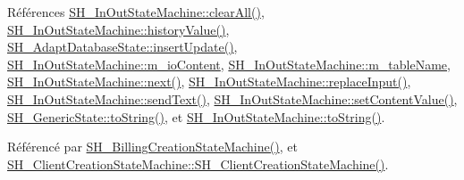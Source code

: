 Références \hyperlink{classSH__InOutStateMachine_ad722deb53285919796b04db5af6e51b4}{S\-H\-\_\-\-In\-Out\-State\-Machine\-::clear\-All()}, \hyperlink{classSH__InOutStateMachine_a84fb2b2c2105cae9c590c0d15960854a}{S\-H\-\_\-\-In\-Out\-State\-Machine\-::history\-Value()}, \hyperlink{classSH__AdaptDatabaseState_ab010e64da052db416328d3bcb9ca01d4}{S\-H\-\_\-\-Adapt\-Database\-State\-::insert\-Update()}, \hyperlink{classSH__InOutStateMachine_a661a1c7bd3b1086b3b5cd60ca957ecbd}{S\-H\-\_\-\-In\-Out\-State\-Machine\-::m\-\_\-io\-Content}, \hyperlink{classSH__InOutStateMachine_acc0f5d5133af2dcca30939f53ec8837b}{S\-H\-\_\-\-In\-Out\-State\-Machine\-::m\-\_\-table\-Name}, \hyperlink{classSH__InOutStateMachine_aa9ee51efe0e17dcf5366c8a97b523892}{S\-H\-\_\-\-In\-Out\-State\-Machine\-::next()}, \hyperlink{classSH__InOutStateMachine_af5f82970faef3bca48a147863dba2ee1}{S\-H\-\_\-\-In\-Out\-State\-Machine\-::replace\-Input()}, \hyperlink{classSH__InOutStateMachine_ae2cbbe3cd207158668dcb4838938c7ad}{S\-H\-\_\-\-In\-Out\-State\-Machine\-::send\-Text()}, \hyperlink{classSH__InOutStateMachine_aa2766b7a7ba39c35a10df7fc0c151b4f}{S\-H\-\_\-\-In\-Out\-State\-Machine\-::set\-Content\-Value()}, \hyperlink{classSH__GenericState_a5480c5ee725fd801d8f6292cd4c803b8}{S\-H\-\_\-\-Generic\-State\-::to\-String()}, et \hyperlink{classSH__InOutStateMachine_a60ecd7de03d948e2d1e9cbedb5c3e5fa}{S\-H\-\_\-\-In\-Out\-State\-Machine\-::to\-String()}.



Référencé par \hyperlink{classSH__BillingCreationStateMachine_ad62b77fa4aeafe200056ff3974562f83}{S\-H\-\_\-\-Billing\-Creation\-State\-Machine()}, et \hyperlink{classSH__ClientCreationStateMachine_a0b406b0f404c0fd33bf35be8ce0cc811}{S\-H\-\_\-\-Client\-Creation\-State\-Machine\-::\-S\-H\-\_\-\-Client\-Creation\-State\-Machine()}.


